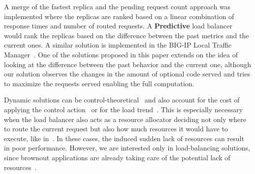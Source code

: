 
A merge of the fastest replica and the pending request count approach was
implemented where the replicas are ranked based on a linear
combination of response times and number of routed requests. A
\textbf{Predictive} load balancer would rank the replicas based on the
difference between the past metrics and the current ones. A similar
solution is implemented in the BIG-IP Local Traffic
Manager~\cite{BIGIP}. One of the solutions proposed in this paper
extends on the idea of looking at the difference between the past
behavior and the current one, although our solution observes the
changes in the amount of optional code served and tries to maximize
the requests served enabling the full computation.

Dynamic solutions can be
control-theoretical~\cite{multipathctlb,comparisonstaticdynamic} and
also account for the cost of applying the control
action~\cite{costofcontrol} or for the load trend~\cite{CasolariSA}.
This is especially necessary when the load balancer also acts as a
resource allocator deciding not only where to route the current
request but also how much resources it would have to execute, 
like in~\cite{Ardagnaalltogether}. In these cases, the induced 
sudden lack of resources can result in poor performance. However, we 
are interested only in load-balancing solutions, since brownout applications
are already taking care of the potential lack of resources~\cite{cloudish-tr}.
